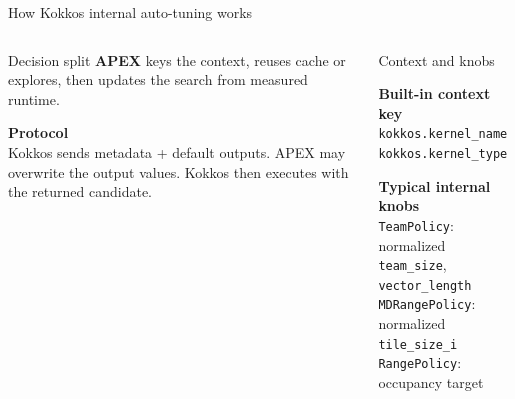 \documentclass[11pt]{beamer}
\begin{document}
\begin{frame}[t,shrink=5]{How Kokkos internal auto-tuning works}
\begin{columns}[T,onlytextwidth]
\begin{beamerboxesrounded}[upper=tuner title,lower=tuner body,width=\linewidth,shadow=false]{Decision split}
\vspace{0.08em}
\textcolor{ceaGreen}{\textbf{APEX}} keys the context, reuses cache or explores, then updates the search from measured runtime.

\vspace{0.08em}
\textbf{Protocol}\\
Kokkos sends metadata + default outputs. APEX may overwrite the output values. Kokkos then executes with the returned candidate.
\end{beamerboxesrounded}

\vspace{0.04em}
\begin{beamerboxesrounded}[upper=profiler title,lower=profiler body,width=\linewidth,shadow=false]{Context and knobs}
\tiny
\raggedright
\textbf{Built-in context key}\\
\texttt{kokkos.kernel\_name}\\
\texttt{kokkos.kernel\_type}

\vspace{0.06em}
\textbf{Typical internal knobs}\\
\texttt{TeamPolicy}: normalized \texttt{team\_size}, \texttt{vector\_length}\\
\texttt{MDRangePolicy}: normalized \texttt{tile\_size\_i}\\
\texttt{RangePolicy}: occupancy target

\end{beamerboxesrounded}
\end{columns}
\end{frame}
\end{document}
